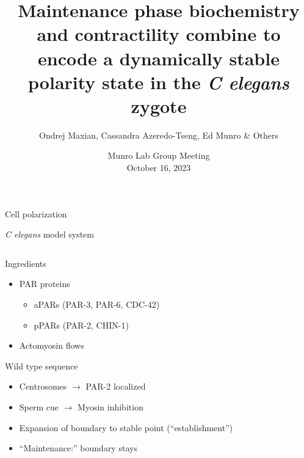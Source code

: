 \documentclass{beamer}
\title[Cell polarity dynamical system]{Maintenance phase biochemistry and contractility combine to encode a dynamically stable polarity state in the \emph{C elegans} zygote \vspace{-0.5 cm}}
\author[Ondrej Maxian, Cassandra Azeredo-Tseng, Ed Munro \& Others]{Ondrej Maxian, Cassandra Azeredo-Tseng, Ed Munro \& Others \vspace{-0.5 cm}}
\date{Munro Lab Group Meeting \\ October 16, 2023}
\newcommand{\6}[1]{#1_{\text{6}}}
\newcommand{\3}[1]{#1_{\text{3}}}
\begin{document}

\begin{frame}
  \titlepage
\vspace{-0.5 cm}
\centering
\end{frame}

\begin{frame}{Cell polarization}
\end{frame}

\begin{frame}{\emph{C elegans} model system}
\begin{columns}
\begin{column}{0.6\textwidth}
Ingredients
\begin{itemize}
\item PAR proteins 
\begin{itemize}
\item aPARs (PAR-3, PAR-6, CDC-42)
\item pPARs (PAR-2, CHIN-1)
\end{itemize}
\item Actomyosin flows 
\end{itemize}
Wild type sequence
\begin{itemize}
\item Centrosomes $\rightarrow$ PAR-2 localized
\item Sperm cue $\rightarrow$ Myosin inhibition
\item Expansion of boundary to stable point (``establishment'')
\item ``Maintenance:'' boundary stays
\end{itemize}
\end{column}


\end{columns}
\end{frame}
\end{document}
